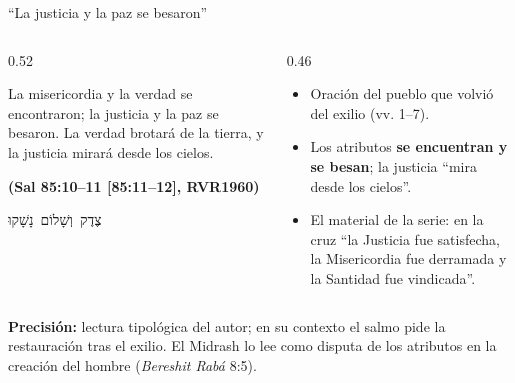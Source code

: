 \documentclass[hyperref={bookmarks=false},aspectratio=169]{beamer}
\newcommand{\heb}[1]{\mbox{\foreignlanguage{hebrew}{#1}}}
\newcommand{\fuente}[1]{\par\hfill{\upshape\bfseries\footnotesize\textcolor{azul}{#1}}}
\newcommand{\destacar}[1]{\textbf{\textcolor{azul}{#1}}}
\newcommand{\precision}[1]{{\footnotesize\color{gris}\textbf{Precisión:} #1}}
\begin{document}
\begin{frame}{``La justicia y la paz se besaron''}
\begin{columns}[c,onlytextwidth]
\begin{column}{0.52\textwidth}
\begin{cita}La misericordia y la verdad se encontraron; la justicia y la paz se besaron. La verdad brotará de la tierra, y la justicia mirará desde los cielos.\fuente{(Sal 85:10--11 [85:11--12], RVR1960)}\end{cita}
\begin{center}\small\heb{צֶדֶק וְשָׁלוֹם נָשָׁקוּ}\end{center}
\end{column}
\begin{column}{0.46\textwidth}\small
\begin{itemize}
\item Oración del pueblo que volvió del exilio (vv. 1--7).
\item Los atributos \destacar{se encuentran y se besan}; la justicia ``mira desde los cielos''.
\item El material de la serie: en la cruz ``la Justicia fue satisfecha, la Misericordia fue derramada y la Santidad fue vindicada''.
\end{itemize}
\end{column}
\end{columns}\par\smallskip
\precision{lectura tipológica del autor; en su contexto el salmo pide la restauración tras el exilio. El Midrash lo lee como disputa de los atributos en la creación del hombre (\emph{Bereshit Rabá} 8:5).}
\end{frame}
\end{document}
